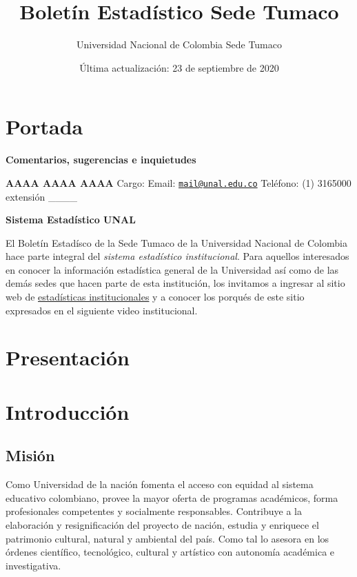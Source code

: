 \documentclass[
]{book}
\title{Boletín Estadístico Sede Tumaco}
\author{ Universidad Nacional de Colombia Sede Tumaco}
\date{Última actualización: 23 de septiembre de 2020}
\begin{document}
\maketitle

{
\setcounter{tocdepth}{1}
\tableofcontents
}
\hypertarget{portada}{%
\chapter*{Portada}\label{portada}}

\textbf{Comentarios, sugerencias e inquietudes}

\textbf{AAAA AAAA AAAA}
Cargo:
Email: \href{mailto:mail@unal.edu.co}{\nolinkurl{mail@unal.edu.co}}
Teléfono: (1) 3165000 extensión \_\_\_\_

\textbf{Sistema Estadístico UNAL}

El Boletín Estadísco de la Sede Tumaco de la Universidad Nacional de Colombia hace parte integral del \emph{sistema estadístico institucional}. Para aquellos interesados en conocer la información estadística general de la Universidad así como de las demás sedes que hacen parte de esta institución, los invitamos a ingresar al sitio web de \href{http://estadisticas.unal.edu.co/home/}{estadísticas institucionales} y a conocer los porqués de este sitio expresados en el siguiente video institucional.

\hypertarget{Presenta}{%
\chapter*{Presentación}\label{Presenta}}

\hypertarget{intro}{%
\chapter*{Introducción}\label{intro}}

\hypertarget{mision}{%
\section*{Misión}\label{mision}}

Como Universidad de la nación fomenta el acceso con equidad al sistema educativo colombiano, provee la mayor oferta de programas académicos, forma profesionales competentes y socialmente responsables. Contribuye a la elaboración y resignificación del proyecto de nación, estudia y enriquece el patrimonio cultural, natural y ambiental del país. Como tal lo asesora en los órdenes científico, tecnológico, cultural y artístico con autonomía académica e investigativa.
\end{document}
